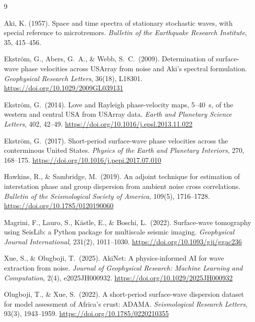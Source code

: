 \documentclass[11pt]{article}
\begin{document}
\begin{thebibliography}{9}

Aki, K. (1957). Space and time spectra of stationary stochastic waves, with special reference to
microtremors. \textit{Bulletin of the Earthquake Research Institute}, 35, 415--456.

Ekstr\"om, G., Abers, G.\ A., \& Webb, S.\ C.\ (2009). Determination of surface-wave phase
velocities across USArray from noise and Aki's spectral formulation. \textit{Geophysical Research
Letters}, 36(18), L18301. \url{https://doi.org/10.1029/2009GL039131}

Ekstr\"om, G.\ (2014). Love and Rayleigh phase-velocity maps, 5--40~s, of the western and central
USA from USArray data. \textit{Earth and Planetary Science Letters}, 402, 42--49.
\url{https://doi.org/10.1016/j.epsl.2013.11.022}

Ekstr\"om, G.\ (2017). Short-period surface-wave phase velocities across the conterminous United
States. \textit{Physics of the Earth and Planetary Interiors}, 270, 168--175.
\url{https://doi.org/10.1016/j.pepi.2017.07.010}

Hawkins, R., \& Sambridge, M.\ (2019). An adjoint technique for estimation of interstation phase
and group dispersion from ambient noise cross correlations. \textit{Bulletin of the Seismological
Society of America}, 109(5), 1716--1728. \url{https://doi.org/10.1785/0120190060}

Magrini, F., Lauro, S., K\"astle, E., \& Boschi, L.\ (2022). Surface-wave tomography using
SeisLib: a Python package for multiscale seismic imaging. \textit{Geophysical Journal
International}, 231(2), 1011--1030. \url{https://doi.org/10.1093/gji/ggac236}

Xue, S., \& Olugboji, T.\ (2025). AkiNet: A physics-informed AI for wave extraction from noise.
\textit{Journal of Geophysical Research: Machine Learning and Computation}, 2(4), e2025JH000932.
\url{https://doi.org/10.1029/2025JH000932}

Olugboji, T., \& Xue, S.\ (2022). A short-period surface-wave dispersion dataset for model
assessment of Africa's crust: ADAMA. \textit{Seismological Research Letters}, 93(3), 1943--1959.
\url{https://doi.org/10.1785/0220210355}

\end{thebibliography}
\end{document}
